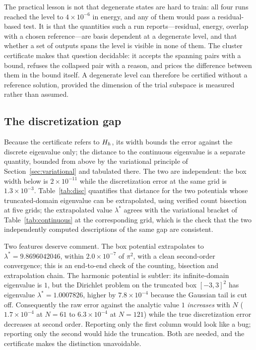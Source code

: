 The practical lesson is not that degenerate states are hard to train: all
four runs reached the level to $4\times10^{-6}$ in energy, and any of them
would pass a residual-based test. It is that the quantities such a run
reports---residual, energy, overlap with a chosen reference---are basis
dependent at a degenerate level, and that whether a set of outputs spans the
level is visible in none of them. The cluster certificate makes that question
decidable: it accepts the spanning pairs with a bound, refuses the collapsed
pair with a reason, and prices the difference between them in the bound
itself. A degenerate level can therefore be certified without a reference
solution, provided the dimension of the trial subspace is measured rather than
assumed.

\subsection{The discretization gap}
\label{sec:discretization}

Because the certificate refers to $\Hh$, its width bounds the error against
the discrete eigenvalue only; the distance to the continuous eigenvalue is a
separate quantity, bounded from above by the variational principle of
Section~\ref{sec:variational} and tabulated there. The two are independent:
the box width below is $2\times10^{-11}$ while the discretization error at the
same grid is $1.3\times10^{-3}$. Table~\ref{tab:disc}
quantifies that distance for the two potentials whose truncated-domain
eigenvalue can be extrapolated, using verified count bisection at five grids;
the extrapolated value $\lambda^\ast$ agrees with the variational bracket of
Table~\ref{tab:continuous} at the corresponding grid, which is the check that
the two independently computed descriptions of the same gap are consistent.

\begin{table}[t]
\centering
\small

\caption{Discretization error $|\lambda_h-\lambda^\ast|$ of the first
eigenvalue of $\Hh$; column headers are the grid size $N$ and
$\lambda^\ast$ is fitted from $\lambda(h)=\lambda^\ast+ch^2$. The
least-squares slope of $\log|\lambda_h-\lambda^\ast|$ against $\log h$ is
$2.00$ for both potentials.}
\label{tab:disc}
\end{table}

Two features deserve comment. The box potential extrapolates to
$\lambda^\ast=9.8696042046$, within $2.0\times10^{-7}$ of $\pi^2$, with a
clean second-order convergence; this is an end-to-end check of the counting,
bisection and extrapolation chain. The harmonic potential is subtler: its
infinite-domain eigenvalue is $1$, but the Dirichlet problem on the truncated
box $[-3,3]^2$ has eigenvalue $\lambda^\ast=1.0007826$, higher by
$7.8\times10^{-4}$ because the Gaussian tail is cut off. Consequently the raw
error against the analytic value $1$ \emph{increases} with $N$
($1.7\times10^{-4}$ at $N=61$ to $6.3\times10^{-4}$ at $N=121$) while the true
discretization error decreases at second order. Reporting only the first
column would look like a bug; reporting only the second would hide the
truncation. Both are needed, and the certificate makes the distinction
unavoidable.

